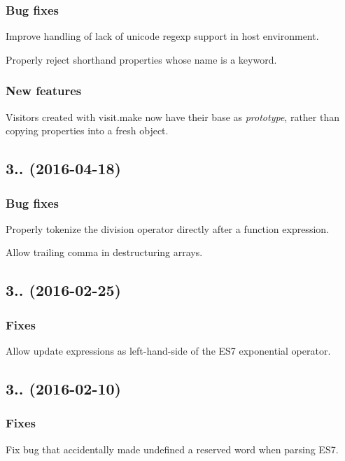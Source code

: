\subsubsection*{Bug fixes}

Improve handling of lack of unicode regexp support in host environment.

Properly reject shorthand properties whose name is a keyword.

\subsubsection*{New features}

Visitors created with {\ttfamily visit.\+make} now have their base as {\itshape prototype}, rather than copying properties into a fresh object.

\subsection*{3.. (2016-\/04-\/18)}

\subsubsection*{Bug fixes}

Properly tokenize the division operator directly after a function expression.

Allow trailing comma in destructuring arrays.

\subsection*{3.. (2016-\/02-\/25)}

\subsubsection*{Fixes}

Allow update expressions as left-\/hand-\/side of the E\+S7 exponential operator.

\subsection*{3.. (2016-\/02-\/10)}

\subsubsection*{Fixes}

Fix bug that accidentally made {\ttfamily undefined} a reserved word when parsing E\+S7.

